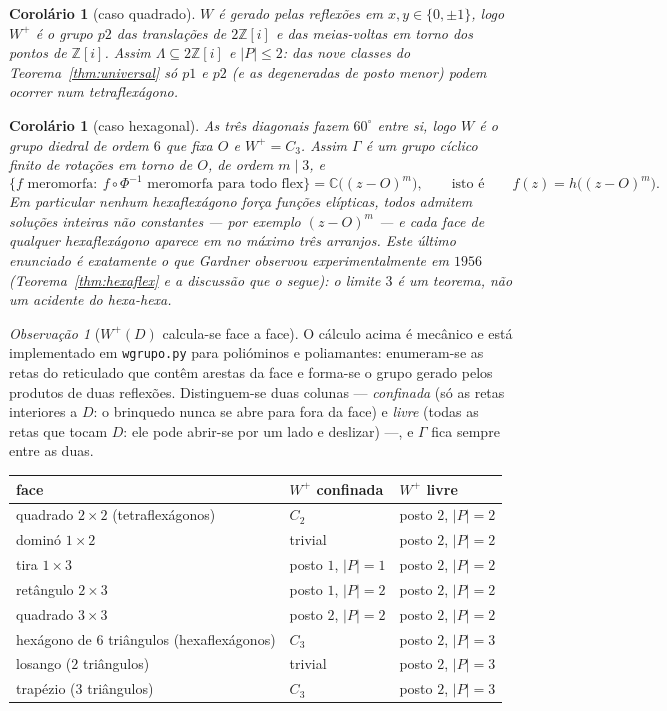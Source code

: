\documentclass[11pt,a4paper]{article}
\theoremstyle{plain}
\newtheorem{corolario}[teorema]{Corolário}
\theoremstyle{definition}
\theoremstyle{remark}
\newtheorem{observacao}[teorema]{Observação}
\newcommand{\C}{\mathbb{C}}
\newcommand{\Z}{\mathbb{Z}}
\newcommand{\Zi}{\Z[i]}
\begin{document}
\begin{corolario}[caso quadrado]\label{cor:quad}
$W$ é gerado pelas reflexões em $x,y\in\{0,\pm1\}$, logo $W^+$ é o grupo $p2$
das translações de $2\Zi$ e das meias-voltas em torno dos pontos de $\Zi$.
Assim $\Lambda\subseteq2\Zi$ e $|P|\le2$: das nove classes do
Teorema~\ref{thm:universal} só $p1$ e $p2$ (e as degeneradas de posto menor)
podem ocorrer num tetraflexágono.
\end{corolario}

\begin{corolario}[caso hexagonal]\label{cor:hex}
As três diagonais fazem $60^\circ$ entre si, logo $W$ é o grupo diedral de
ordem $6$ que fixa $O$ e $W^+=C_3$. Assim $\Gamma$ é um grupo cíclico
\emph{finito} de rotações em torno de $O$, de ordem $m\mid3$, e
\[
\{f \text{ meromorfa}:\ f\circ\Phi^{-1}\text{ meromorfa para todo flex}\}
=\C\big((z-O)^m\big),\qquad\text{isto é}\qquad f(z)=h\big((z-O)^m\big).
\]
Em particular \emph{nenhum} hexaflexágono força funções elípticas, todos
admitem soluções inteiras não constantes --- por exemplo $(z-O)^m$ --- e
\emph{cada face de qualquer hexaflexágono aparece em no máximo três
arranjos}. Este último enunciado é exatamente o que Gardner observou
experimentalmente em $1956$ (Teorema~\ref{thm:hexaflex} e a discussão que o
segue): o limite $3$ é um teorema, não um acidente do hexa-hexa.
\end{corolario}

\begin{observacao}[$W^+(D)$ calcula-se face a face]\label{obs:wgrupo}
O cálculo acima é mecânico e está implementado em \texttt{wgrupo.py} para
polióminos e poliamantes: enumeram-se as retas do reticulado que contêm
arestas da face e forma-se o grupo gerado pelos produtos de duas reflexões.
Distinguem-se duas colunas --- \emph{confinada} (só as retas interiores a $D$:
o brinquedo nunca se abre para fora da face) e \emph{livre} (todas as retas
que tocam $D$: ele pode abrir-se por um lado e deslizar) ---, e $\Gamma$ fica
sempre entre as duas.
\begin{center}
\renewcommand{\arraystretch}{1.15}
\begin{tabular}{lll}
\toprule
face & $W^+$ confinada & $W^+$ livre\\
\midrule
quadrado $2\times2$ (tetraflexágonos) & $C_2$ & posto $2$, $|P|=2$\\
dominó $1\times2$ & trivial & posto $2$, $|P|=2$\\
tira $1\times3$ & posto $1$, $|P|=1$ & posto $2$, $|P|=2$\\
retângulo $2\times3$ & posto $1$, $|P|=2$ & posto $2$, $|P|=2$\\
quadrado $3\times3$ & posto $2$, $|P|=2$ & posto $2$, $|P|=2$\\
\midrule
hexágono de $6$ triângulos (hexaflexágonos) & $C_3$ & posto $2$, $|P|=3$\\
losango ($2$ triângulos) & trivial & posto $2$, $|P|=3$\\
trapézio ($3$ triângulos) & $C_3$ & posto $2$, $|P|=3$\\
\bottomrule
\end{tabular}
\end{center}
\end{observacao}
\end{document}
